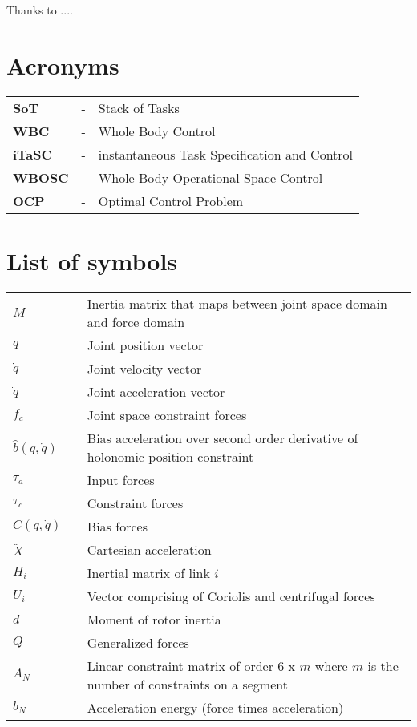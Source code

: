\documentclass[rnd]{mas_report}
\newcommand\nomenclature[3]{#1 & #2 & #3 \\}
\begin{document}
	
	\begin{acknowledgements}
		Thanks to ....
	\end{acknowledgements}
	
	
	{\hypersetup{hidelinks}
			\tableofcontents
	}
	\listoffigures
	\listoftables

	\newpage
	\chapter*{Acronyms}
	\begin{longtable}{@{}p{2.5cm}@{}p{1cm}@{}p{\dimexpr\textwidth-1cm\relax}@{}}
		\label{sot}\nomenclature{\textbf{SoT}}{-}{Stack of Tasks}%
		\label{wbc}\nomenclature{\textbf{WBC}}{-}{Whole Body Control}%
		\label{itasc}\nomenclature{\textbf{iTaSC}}{-}{instantaneous Task Specification and Control}%
		\label{wbosc}\nomenclature{\textbf{WBOSC}}{-}{Whole Body Operational Space Control}%
		\label{ocp}\nomenclature{\textbf{OCP}}{-}{Optimal Control Problem}%
	\end{longtable}
	
	\newpage
	\chapter*{List of symbols}
	\begin{longtable}{@{}p{1.8cm}@{}p{1cm}@{}p{\dimexpr\textwidth-1cm\relax}@{}}
		\nomenclature{$M$}{}{Inertia matrix that maps between joint space domain and force domain \setstretch{1.5}} 
		\nomenclature{$q$}{}{Joint position vector}
		\nomenclature{$\dot{q}$}{}{Joint velocity vector}
		\nomenclature{$\ddot{q}$}{}{Joint acceleration vector}
		\nomenclature{$f_c$}{}{Joint space constraint forces}
		\nomenclature{$\hat{b}(q, \dot{q})$}{}{Bias acceleration over second order derivative of holonomic position constraint}
		\nomenclature{$\tau_a$}{}{Input forces}
		\nomenclature{$\tau_c$}{}{Constraint forces}
		\nomenclature{$C(q, \dot{q})$}{}{Bias forces}
		\nomenclature{$\ddot{X}$}{}{Cartesian acceleration}
		\nomenclature{$H_i$}{}{Inertial matrix of link $i$}
		\nomenclature{$U_i$}{}{Vector comprising of Coriolis and centrifugal forces}
		\nomenclature{$d$}{}{Moment of rotor inertia}
		\nomenclature{$Q$}{}{Generalized forces}
		\nomenclature{$A_N$}{}{Linear constraint matrix of order 6 x $m$ where $m$ is the number of constraints on a segment}
		\nomenclature{$b_N$}{}{Acceleration energy (force times acceleration)}	
	\end{longtable}
\end{document}
